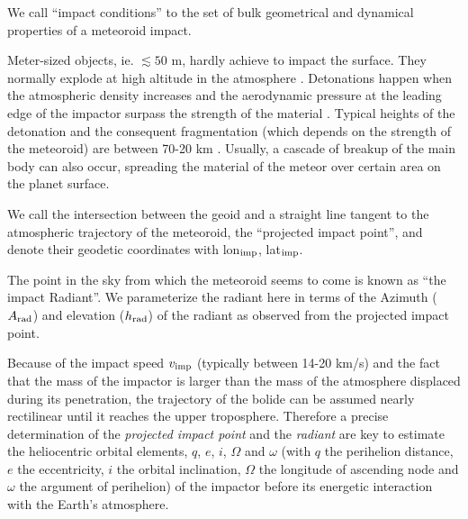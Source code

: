 \documentclass[fleqn,usenatbib]{mnras}
\newcommand{\sub}[1]{_{\rm #1}}
\newcommand{\vimp}{v\sub{imp}}
\begin{document}
We call ``impact conditions'' to the set of bulk geometrical and dynamical properties of a meteoroid impact.

Meter-sized objects, ie. $\lesssim 50$ m, hardly achieve to impact the surface.  They normally explode at high altitude in the atmosphere \citep{Brown2002}. Detonations happen when the atmospheric density increases and the aerodynamic pressure at the leading edge of the impactor surpass the strength of the material \citep{Hills1998}. Typical heights of the detonation and the consequent fragmentation (which depends on the strength of the meteoroid) are between 70-20 km \citep{Svetsov1995,Collins2005}. Usually, a cascade of breakup of the main body can also occur, spreading the material of the meteor over certain area on the planet surface. 


We call the intersection between the geoid and a straight line tangent to the atmospheric trajectory of the meteoroid, the ``projected impact point'', and denote their geodetic coordinates with lon$_{\rm imp}$, lat$_{\rm imp}$.

The point in the sky from which the meteoroid seems to come is known as ``the impact Radiant''. We parameterize the radiant here in terms of the Azimuth ($A_{\rm rad}$) and elevation ($h_{\rm rad}$) of the radiant as observed from the projected impact point.


Because of the impact speed $\vimp$ (typically between 14-20 km/s) and the fact that the mass of the impactor is larger than the mass of the atmosphere displaced during its penetration, the trajectory of the bolide can be assumed nearly rectilinear until it reaches the upper  troposphere.  Therefore a precise determination of the \textit{projected impact point} and the \textit{radiant} are key to estimate the heliocentric orbital elements, $q$, $e$, $i$, $\Omega$ and $\omega$ (with $q$ the perihelion distance, $e$ the eccentricity, $i$ the orbital inclination, $\Omega$ the longitude of ascending node and $\omega$ the argument of perihelion) of the impactor before its energetic interaction with the Earth's atmosphere. 
\end{document}
